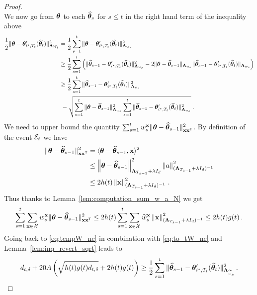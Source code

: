 \begin{proof}
\begin{equation}
\end{equation}
We now go from ${\boldsymbol \theta}$ to each $\widehat{{\boldsymbol \theta}}_s$ for $s \le t$ in the right hand term of the inequality above
\begin{align}
\frac{1}{2}\Vert {\boldsymbol \theta} - {\boldsymbol \theta}'_{i^\star,T_t}(\widehat{{\boldsymbol \theta}}_t) \Vert_{{\boldsymbol \Lambda}_{W_t}}^2
&=   \frac{1}{2} \sum_{s=1}^t  \Vert {\boldsymbol \theta} - {\boldsymbol \theta}'_{i^\star,T_t}(\widehat{{\boldsymbol \theta}}_t) \Vert_{{\boldsymbol \Lambda}_{w_s}}^2
\nonumber\\
&\ge \frac{1}{2} \sum_{s=1}^t \left(\Vert \widehat{{\boldsymbol \theta}}_{s-1} - {\boldsymbol \theta}'_{i^\star,T_t}(\widehat{{\boldsymbol \theta}}_t)\Vert_{{\boldsymbol \Lambda}_{w_s}}^2 - 2\Vert {\boldsymbol \theta} - \widehat{{\boldsymbol \theta}}_{s-1} \Vert_{{\boldsymbol \Lambda}_{w_s}} \Vert \widehat{{\boldsymbol \theta}}_{s-1} - {\boldsymbol \theta}'_{i^\star,T_t}(\widehat{{\boldsymbol \theta}}_t) \Vert_{{\boldsymbol \Lambda}_{w_s}}\right)
\nonumber\\
&\ge \frac{1}{2} \sum_{s=1}^t \Vert \widehat{{\boldsymbol \theta}}_{s-1} - {\boldsymbol \theta}'_{i^\star,T_t}(\widehat{{\boldsymbol \theta}}_t) \Vert_{{\boldsymbol \Lambda}_{w_s}}^2
\nonumber\\
&\ - \sqrt{\sum_{s=1}^t \Vert {\boldsymbol \theta} - \widehat{{\boldsymbol \theta}}_{s-1} \Vert_{{\boldsymbol \Lambda}_{w_s}}^2 \sum_{s=1}^t\Vert \widehat{{\boldsymbol \theta}}_{s-1} -{\boldsymbol \theta}'_{i^\star,T_t}(\widehat{{\boldsymbol \theta}}_t) \Vert_{{\boldsymbol \Lambda}_{w_s}}^2}
\: .\label{eq:tempW_nc}
\end{align}
We need to upper bound the quantity $\sum_{s=1}^t  w_s^{{\bf x}}\Vert {\boldsymbol \theta} - \widehat{{\boldsymbol \theta}}_{s-1} \Vert_{{\bf x}{\bf x}^\mathsf{\scriptscriptstyle T}}^2$. By definition of the event $\mathcal{E}_t$ we have
\begin{align*}
  \Vert {\boldsymbol \theta} - \widehat{{\boldsymbol \theta}}_{s-1} \Vert_{{\bf x}{\bf x}^\mathsf{\scriptscriptstyle T}}^2 &=  \langle {\boldsymbol \theta} - \widehat{{\boldsymbol \theta}}_{s-1} ,{\bf x}\rangle^2\\
  &\leq\left\lVert {\boldsymbol \theta} - \widehat{{\boldsymbol \theta}}_{s-1}\right\rVert_{{\boldsymbol \Lambda}_{T_{s-1}}+\lambda I_d}^2 \left\lVert a\right\rVert_{({\boldsymbol \Lambda}_{T_{s-1}}+\lambda I_d)^{-1}}^2\\
  &\leq 2 h(t) \left\lVert{\bf x}\right\rVert_{({\boldsymbol \Lambda}_{T_{s-1}}+\lambda I_d)^{-1}}^2\,.
\end{align*}
Thus thanks to Lemma~\ref{lem:computation_sum_w_a_N} we get
\begin{align*}
  \sum_{s=1}^t \sum_{{\bf x}\in\mathcal{X}} w_s^{{\bf x}}\Vert {\boldsymbol \theta} - \widehat{{\boldsymbol \theta}}_{s-1} \Vert_{{\bf x}{\bf x}^\mathsf{\scriptscriptstyle T}}^2 \leq 2h(t)\sum_{s=1}^t \sum_{{\bf x}\in\mathcal{X}} \widetilde{w}_s^{{\bf x}} \left\lVert {\bf x}\right\rVert_{({\boldsymbol \Lambda}_{T_{s-1}}+\lambda I_d)^{-1}}^2 \leq 2h(t)g(t)\,.
\end{align*}
Going back to \eqref{eq:tempW_nc} in combination with \eqref{eq:to_tW_nc} and Lemma~\ref{lem:inq_revert_sqrt} leads to
\begin{align}
\label{eq:to_hteta_nc}
d_{t,\delta} + 20 A\left(\sqrt{h(t)g(t) d_{t,\delta}}+ 2h(t)g(t)\right)   \geq
\frac{1}{2}\sum_{s=1}^t \Vert \widehat{{\boldsymbol \theta}}_{s-1} - {\boldsymbol \theta}'_{i^\star,T_t}(\widehat{{\boldsymbol \theta}}_t)\Vert_{{\boldsymbol \Lambda}_{\widetilde{w}_s}}^2\,.
\end{align}
\end{proof}


